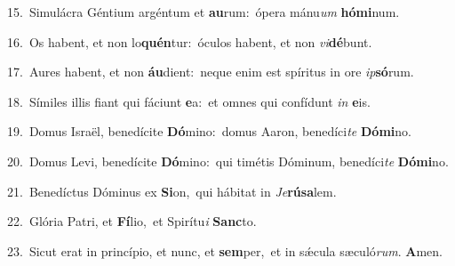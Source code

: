{\numbfont\textcolor{\numbcolor}{15.}}~Simulácra Géntium argéntum et \textbf{au}\-rum:~\star ópera mánu\textit{um} \textbf{hó}\-\textbf{mi}num.\par
{\numbfont\textcolor{\numbcolor}{16.}}~Os habent, et non lo\-\textbf{quén}\-tur:~\star óculos habent, et non \textit{vi}\-\textbf{dé}bunt.\par
{\numbfont\textcolor{\numbcolor}{17.}}~Aures habent, et non \textbf{áu}\-dient:~\star neque enim est spíritus in ore \textit{ip}\-\textbf{só}rum.\par
{\numbfont\textcolor{\numbcolor}{18.}}~Símiles illis fiant qui fáciunt \textbf{e}\-a:~\star et omnes qui confídunt \textit{in} \textbf{e}\-is.\par
{\numbfont\textcolor{\numbcolor}{19.}}~Domus Israël, benedícite \textbf{Dó}\-mino:~\star domus Aaron, benedíci\textit{te} \textbf{Dó}\-\textbf{mi}no.\par
{\numbfont\textcolor{\numbcolor}{20.}}~Domus Levi, benedícite \textbf{Dó}\-mino:~\star qui timétis Dóminum, benedíci\textit{te} \textbf{Dó}\-\textbf{mi}no.\par
{\numbfont\textcolor{\numbcolor}{21.}}~Benedíctus Dóminus ex \textbf{Si}\-on,~\star qui hábitat in \textit{Je}\-\textbf{rú}\textbf{sa}lem.\par
{\numbfont\textcolor{\numbcolor}{22.}}~Glória Patri, et \textbf{Fí}\-lio,~\star et Spirítu\textit{i} \textbf{Sanc}\-to.\par
{\numbfont\textcolor{\numbcolor}{23.}}~Sicut erat in princípio, et nunc, et \textbf{sem}\-per,~\star et in sǽcula sæculó\-\textit{rum}\-. \textbf{A}\-men.\par
